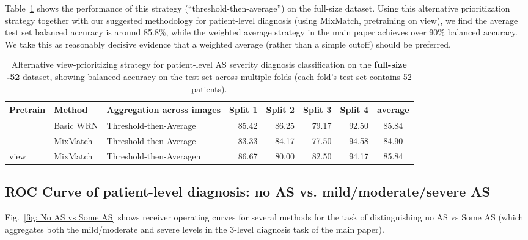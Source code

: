 Table~\ref{tab:Suggested_Aggregation_Ablation} shows the performance of this strategy (``threshold-then-average'') on the full-size dataset.
Using this alternative prioritization strategy together with our suggested methodology for patient-level diagnosis (using MixMatch, pretraining on view), we find the average test set balanced accuracy is around 85.8\%, while the weighted average strategy in the main paper achieves over 90\% balanced accuracy. We take this as reasonably decisive evidence that a weighted average (rather than a simple cutoff) should be preferred.

\begin{table}[!h]
    \centering
    \begin{tabular}{l l l|rrrr|c}
    Pretrain & Method & Aggregation across images
    & Split 1  & Split 2 & Split 3 & Split 4 & average\\
    \hline
    & Basic WRN & Threshold-then-Average & 85.42 & 86.25 & 79.17 & 92.50 & 85.84 \\
    & MixMatch & Threshold-then-Average & 83.33 & 84.17 & 77.50 & 94.58 & 84.90 \\
    view & MixMatch & Threshold-then-Averagen & 86.67 & 80.00 & 82.50 & 94.17 & 85.84\\
    \end{tabular}
    \caption{Alternative view-prioritizing strategy for patient-level AS severity diagnosis classification on the \textbf{full-size -52} dataset, showing balanced accuracy on the test set across multiple folds (each fold’s test set contains 52 patients).}
    \label{tab:Suggested_Aggregation_Ablation}
\end{table}



\subsection{ROC Curve of patient-level diagnosis: no AS vs. mild/moderate/severe AS}

Fig.~\ref{fig: No AS vs Some AS} shows receiver operating curves for several methods for the task of distinguishing no AS vs Some AS (which aggregates both the mild/moderate and severe levels in the 3-level diagnosis task of the main paper).

